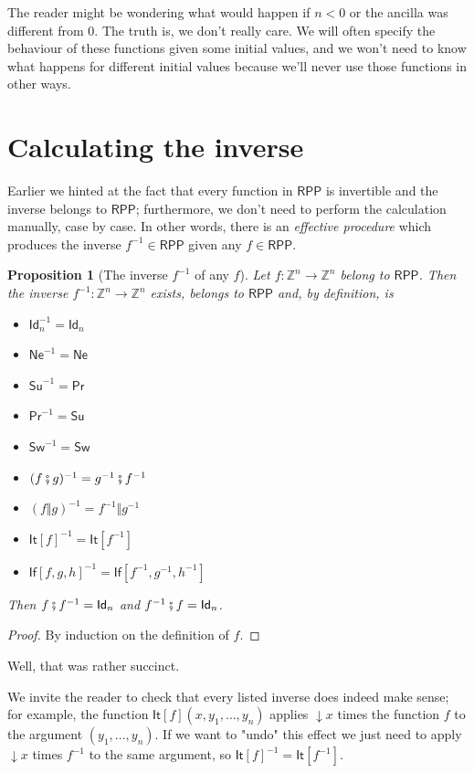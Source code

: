 \documentclass{book}
\theoremstyle{definition}
\theoremstyle{remark}
\theoremstyle{plain}
\newtheorem{proposition}{Proposition}
\newcommand{\ZZ}{\mathbb{Z}}
\newcommand{\RPP}{\mathsf{RPP}}
\newcommand{\rppId}{\mathsf{Id}}
\newcommand{\rppNe}{\mathsf{Ne}}
\newcommand{\rppSu}{\mathsf{Su}}
\newcommand{\rppPr}{\mathsf{Pr}}
\newcommand{\rppSw}{\mathsf{Sw}}
\newcommand{\rppCo}{\fatsemi}
\newcommand{\rppPa}{\Vert}
\newcommand{\rppIt}{\mathsf{It}}
\newcommand{\rppIf}{\mathsf{If}}
\begin{document}
The reader might be wondering what would happen if $n < 0$ or the ancilla was different from $0$.
The truth is, we don't really care.
We will often specify the behaviour of these functions given some initial values,
and we won't need to know what happens for different initial values because we'll never use those functions in other ways.

\section{Calculating the inverse}

Earlier we hinted at the fact that every function in $\RPP$ is invertible and the inverse belongs to $\RPP$;
furthermore, we don't need to perform the calculation manually, case by case.
In other words, there is an \textit{effective procedure} which produces the inverse $f^{-1} \in \RPP$ given any $f \in \RPP$.

\begin{proposition}[The inverse $f^{-1}$ of any $f$]
\label{rppinv}
Let $f : \ZZ^n \to \ZZ^n$ belong to $\RPP$.
Then the inverse $f^{-1} : \ZZ^n \to \ZZ^n$ exists, belongs to $\RPP$ and, by definition, is
\begin{itemize}
\item $\rppId_n^{-1} = \rppId_n$
\item $\rppNe^{-1} = \rppNe$
\item $\rppSu^{-1} = \rppPr$
\item $\rppPr^{-1} = \rppSu$
\item $\rppSw^{-1} = \rppSw$
\item $(f \rppCo g)^{-1} = g^{-1} \rppCo f^{-1}$
\item $(f \rppPa g)^{-1} = f^{-1} \rppPa g^{-1}$
\item ${\rppIt[f]}^{-1} = \rppIt[f^{-1}]$
\item ${\rppIf[f, g, h]}^{-1} = \rppIf [f^{-1}, g^{-1}, h^{-1}]$
\end{itemize}
Then $f \rppCo f^{-1} = \rppId_n$ and $f^{-1} \rppCo f = \rppId_n$.
\end{proposition}
\begin{proof}
By induction on the definition of $f$.
\end{proof}

Well, that was rather succinct.

We invite the reader to check that every listed inverse does indeed make sense;
for example, the function $\rppIt[f] (x, y_1, \dots, y_n)$ applies $\downarrow x$ times the function $f$ to the argument $(y_1, \dots, y_n)$.
If we want to "undo" this effect we just need to apply $\downarrow x$ times $f^{-1}$ to the same argument, so
${\rppIt[f]}^{-1} = \rppIt[f^{-1}]$.
\end{document}
